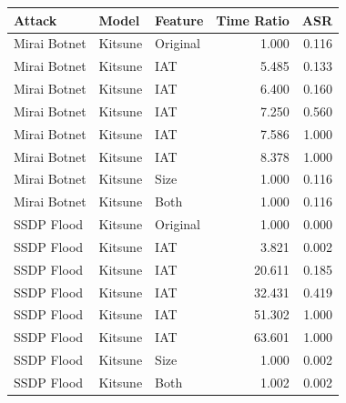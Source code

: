 \begin{tabular}{lllrr}
\toprule
Attack & Model & Feature & Time Ratio & ASR \\
\midrule
Mirai Botnet & Kitsune & Original & 1.000 & 0.116 \\
Mirai Botnet & Kitsune & IAT & 5.485 & 0.133 \\
Mirai Botnet & Kitsune & IAT & 6.400 & 0.160 \\
Mirai Botnet & Kitsune & IAT & 7.250 & 0.560 \\
Mirai Botnet & Kitsune & IAT & 7.586 & 1.000 \\
Mirai Botnet & Kitsune & IAT & 8.378 & 1.000 \\
Mirai Botnet & Kitsune & Size & 1.000 & 0.116 \\
Mirai Botnet & Kitsune & Both & 1.000 & 0.116 \\
SSDP Flood & Kitsune & Original & 1.000 & 0.000 \\
SSDP Flood & Kitsune & IAT & 3.821 & 0.002 \\
SSDP Flood & Kitsune & IAT & 20.611 & 0.185 \\
SSDP Flood & Kitsune & IAT & 32.431 & 0.419 \\
SSDP Flood & Kitsune & IAT & 51.302 & 1.000 \\
SSDP Flood & Kitsune & IAT & 63.601 & 1.000 \\
SSDP Flood & Kitsune & Size & 1.000 & 0.002 \\
SSDP Flood & Kitsune & Both & 1.002 & 0.002 \\
\bottomrule
\end{tabular}
